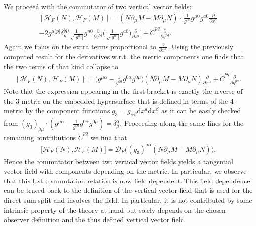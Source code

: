 \documentclass[a4paper,12pt, DIV=14, BCOR=5mm, twoside, headsepline, numbers=noenddot]{scrbook}
\begin{document}
We proceed with the commutator of two vertical vector fields:
\begin{multline}
    \left[ \mathcal{H}_F(N), \mathcal{H}_F(M) \right] = \left( N\partial_{\mu} M - M \partial_{\mu}N  \right) \cdot \biggl[ \frac{1}{g^{00}} g^{\mu 0} g^{a0} \frac{\partial}{\partial x^a}  \\
    -2 g^{\mu (p\vert} \delta^{\vert q)}_{n} \frac{1}{\sqrt{\vert g^{00} \vert }} g^{n0}  \frac{\partial}{\partial g ^{pq}} \biggl( \frac{1}{\sqrt{\vert g^{00} \vert }} g^{a0} \biggr) \frac{\partial}{\partial x^a} \biggr] + \tilde{C}^{pq} \frac{\partial}{\partial g^{pq}}.
\end{multline}
Again we focus on the extra terms proportional to $\frac{\partial}{\partial x^a}$. Using the previously computed result for the derivatives w.r.t. the metric components one finds that the two terms of that kind collapse to 
\begin{align}
    \left[ \mathcal{H}_F(N), \mathcal{H}_F(M) \right] = \bigl( g^{\mu \alpha} - \frac{1}{g^{00}} g^{0\alpha} g^{0 \mu} \bigr) \left( N\partial_{\mu} M - M \partial_{\mu}N  \right) \frac{\partial}{\partial x^{\alpha}} + \tilde{C}^{pq} \frac{\partial}{\partial g^{pq}}.
\end{align}
Note that the expression appearing in the first bracket is exactly the inverse of the 3-metric on the embedded hypersurface that is defined in terms of the 4-metric by the component functions $g_3 = g_{\alpha \beta} \mathrm{d}x^{\alpha} \mathrm{d}x^{\beta}$ as it can be easily checked from $(g_3)_{\beta \mu } \cdot ( g^{\mu \alpha} - \frac{1}{g^{00}} g^{0\alpha} g^{0 \mu} ) = \delta_{\beta}^{\alpha}$. Proceeding along the same lines for the remaining contributions $\tilde{C}^{pq}$ we find that
\begin{align}\label{FHH}
    \bigl[ \mathcal{H}_F(N), \mathcal{H}_F(M) \bigr] =  \mathcal{D}_F\bigl( (g_3)^{\mu \alpha}( N\partial_{\mu} M - M \partial_{\mu}N  ) \bigr).
\end{align}
Hence the commutator between two vertical vector fields yields a tangential vector field with components depending on the metric.
In particular, we observe that this last commutation relation is now field dependent. This field dependence can be traced back to the definition of the vertical vector field that is used for the direct sum split and involves the field. 
In particular, it is not contributed by some intrinsic property of the theory at hand but solely depends on the chosen observer definition and the thus defined vertical vector field.
\end{document}
